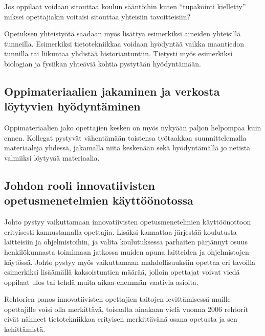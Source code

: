 \documentclass[utf8,bachelor]{gradu3}
\begin{document}
Jos oppilaat voidaan sitouttaa koulun sääntöihin kuten “tupakointi kielletty” miksei opettajiakin voitaisi sitouttaa yhteisiin tavoitteisiin?

Opetuksen yhteistyötä saadaan myös lisättyä esimerkiksi aineiden yhteisillä tunneilla. Esimerkiksi tietotekniikkaa voidaan hyödyntää vaikka maantiedon tunnilla tai liikuntaa yhdistää historiantuntiin. Tietysti myös esimerkiksi biologian ja fysiikan yhteäviä kohtia pystytään hyödyntämään.

\subsection{Oppimateriaalien jakaminen ja verkosta löytyvien hyödyntäminen}
Oppimateriaalien jako opettajien kesken on myös nykyään paljon helpompaa kuin ennen. Kollegat pystyvät vähentämään toistensa työtaakkaa suunnittelemalla materiaaleja yhdessä, jakamalla niitä keskenään sekä hyödyntämällä jo netistä valmiiksi löytyvää materiaalia.


\subsection{Johdon rooli innovatiivisten opetusmenetelmien käyttöönotossa}
Johto pystyy vaikuttamaan innovatiivisten opetusmenetelmien käyttöönottoon erityisesti kannustamalla opettajia. Lisäksi kannattaa järjestää koulutusta laitteisiin ja ohjelmistoihin, ja valita koulutuksessa parhaiten pärjännyt osuus henkilökunnasta toimimaan jatkossa muiden apuna laitteiden ja ohjelmistojen käytössä. Johto pystyy myös vaikuttamaan mahdollisuuksiin opettaa eri tavoilla esimerkiksi lisäämällä kaksoistuntien määrää, jolloin opettajat voivat viedä oppilaat ulos tai tehdä muita aikaa enemmän vaativia asioita. 
 
 Rehtorien panos innovatiivisten opettajien taitojen levittämisessä muille opettajille voisi olla merkittävä, toisaalta ainakaan vielä vuonna 2006 rehtorit eivät nähneet tietotekniikkaa erityisen merkittävänä osana opetusta ja sen kehittämistä. \parencite[][]{koulunArki}
\end{document}
